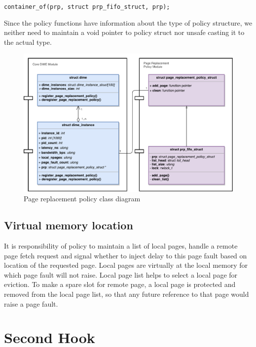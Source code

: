\begin{center}
	\verb|container_of(prp, struct prp_fifo_struct, prp);|
\end{center}

Since the policy functions have information about the type of policy structure, we neither need to maintain a void pointer to policy struct nor unsafe casting it to the actual type.

\begin{figure}[tbp]
	\centering
	\includegraphics[width=\textwidth]{implementation/class_diagram.pdf}
	\caption[Class Diagram]{Page replacement policy class diagram}
	\label{fig:class_diagram} 
\end{figure}


\subsection{Virtual memory location}
It is responsibility of policy to maintain a list of local pages, handle a remote page fetch request and signal whether to inject delay to this page fault based on location of the requested page.
Local pages are virtually at the local memory for which page fault will not raise. Local page list helps to select a local page for eviction. To make a spare slot for remote page, a local page is protected and removed from the local page list, so that any future reference to that page would raise a page fault.

\section{Second Hook}

